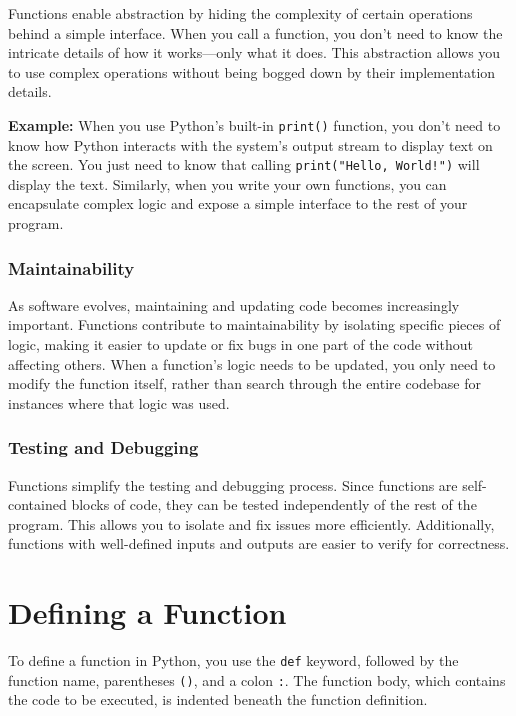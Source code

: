 \documentclass[
  letterpaper,
  DIV=11,
  numbers=noendperiod]{scrreprt}
\begin{document}
Functions enable abstraction by hiding the complexity of certain
operations behind a simple interface. When you call a function, you
don't need to know the intricate details of how it works---only what it
does. This abstraction allows you to use complex operations without
being bogged down by their implementation details.

\textbf{Example:} When you use Python's built-in \texttt{print()}
function, you don't need to know how Python interacts with the system's
output stream to display text on the screen. You just need to know that
calling \texttt{print("Hello,\ World!")} will display the text.
Similarly, when you write your own functions, you can encapsulate
complex logic and expose a simple interface to the rest of your program.

\hypertarget{maintainability}{%
\subsubsection{Maintainability}\label{maintainability}}

As software evolves, maintaining and updating code becomes increasingly
important. Functions contribute to maintainability by isolating specific
pieces of logic, making it easier to update or fix bugs in one part of
the code without affecting others. When a function's logic needs to be
updated, you only need to modify the function itself, rather than search
through the entire codebase for instances where that logic was used.

\hypertarget{testing-and-debugging}{%
\subsubsection{Testing and Debugging}\label{testing-and-debugging}}

Functions simplify the testing and debugging process. Since functions
are self-contained blocks of code, they can be tested independently of
the rest of the program. This allows you to isolate and fix issues more
efficiently. Additionally, functions with well-defined inputs and
outputs are easier to verify for correctness.

\hypertarget{defining-a-function}{%
\section{Defining a Function}\label{defining-a-function}}

To define a function in Python, you use the \texttt{def} keyword,
followed by the function name, parentheses \texttt{()}, and a colon
\texttt{:}. The function body, which contains the code to be executed,
is indented beneath the function definition.
\end{document}
